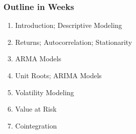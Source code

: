 \begin{frame}%
\frametitle{Outline in Weeks}
\begin{enumerate}
\item Introduction; Descriptive Modeling
\item Returns; Autocorrelation; Stationarity
\item ARMA Models
\item Unit Roots; ARIMA Models
\item Volatility Modeling
\item Value at Risk
\item Cointegration
\end{enumerate}
\end{frame}%